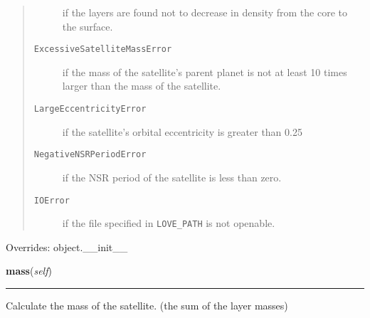 \begin{boxedminipage}{\funcwidth}
\begin{quote}
\begin{description}
          if the layers are found not to decrease in density from the core 
          to the surface.

          \item[\texttt{ExcessiveSatelliteMassError}]

          if the mass of the satellite's parent planet is not at least 10 
          times larger than the mass of the satellite.

          \item[\texttt{LargeEccentricityError}]

          if the satellite's orbital eccentricity is greater than 0.25

          \item[\texttt{NegativeNSRPeriodError}]

          if the NSR period of the satellite is less than zero.

          \item[\texttt{IOError}]

          if the file specified in \texttt{LOVE\_PATH} is not openable.

        \end{description}

      \end{quote}

      Overrides: object.\_\_init\_\_

    \end{boxedminipage}

    \label{satstress:SatStress:Satellite:mass}

    \vspace{0.5ex}

\hspace{.8\funcindent}\begin{boxedminipage}{\funcwidth}

    \raggedright \textbf{mass}(\textit{self})

    \vspace{-1.5ex}

    \rule{\textwidth}{0.5\fboxrule}
\setlength{\parskip}{2ex}
    Calculate the mass of the satellite. (the sum of the layer masses)

\setlength{\parskip}{1ex}
    \end{boxedminipage}

    \label{satstress:SatStress:Satellite:radius}

